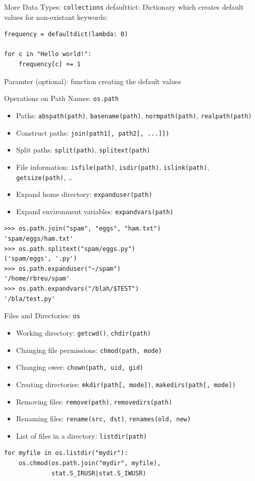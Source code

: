\begin{frame}[fragile]{More Data Types: \texttt{collections}}
\alert{defaulttict}: Dictionary which creates default values for non-existant keywords:
\begin{lstlisting}
frequency = defaultdict(lambda: 0)

for c in "Hello world!":
    frequency[c] += 1
\end{lstlisting}
Paramter (optional): function creating the default values
\end{frame}


\begin{frame}[fragile]{Operations on Path Names: \texttt{os.path}}
\begin{itemize}
\item Paths: \texttt{abspath(path)}, \texttt{basename(path)}, \texttt{normpath(path)}, \texttt{realpath(path)}
\item Construct paths: \texttt{join(path1[, path2[, ...]])}
\item Split paths: \texttt{split(path)}, \texttt{splitext(path)}
\item File information: \texttt{isfile(path)}, \texttt{isdir(path)}, \texttt{islink(path)}, \texttt{getsize(path)}, \dots
\item Expand home directory: \texttt{expanduser(path)}
\item Expand environment variables: \texttt{expandvars(path)}
\end{itemize} 
\begin{lstlisting}[style=Shell]
>>> os.path.join("spam", "eggs", "ham.txt")
'spam/eggs/ham.txt'
>>> os.path.splitext("spam/eggs.py")
('spam/eggs', '.py')
>>> os.path.expanduser("~/spam")
'/home/rbreu/spam'
>>> os.path.expandvars("/blah/$TEST")
'/bla/test.py'
\end{lstlisting}%
\end{frame}

\begin{frame}[fragile]{Files and Directories: \texttt{os}}
\begin{itemize}
\item Working directory: \lstinline{getcwd()}, \lstinline{chdir(path)}
\item Changing file permissions: \lstinline{chmod(path, mode)}
\item Changing ower: \lstinline{chown(path, uid, gid)}
\item Creating directories: \lstinline{mkdir(path[, mode])}, \lstinline{makedirs(path[, mode])}
\item Removing files: \lstinline{remove(path)}, \lstinline{removedirs(path)}
\item Renaming files: \lstinline{rename(src, dst)}, \lstinline{renames(old, new)}
\item List of files in a directory: \lstinline{listdir(path)}
\end{itemize}
\begin{lstlisting}[style=Python]
for myfile in os.listdir("mydir"):
    os.chmod(os.path.join("mydir", myfile), 
             stat.S_IRUSR|stat.S_IWUSR)
\end{lstlisting}
\end{frame} 

